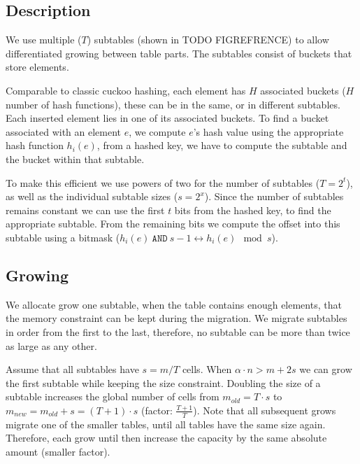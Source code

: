 \documentclass[a4paper,UKenglish]{lipics-v2016}
\begin{document}
\subsection{Description}
We use multiple ($T$) subtables (shown in TODO FIGREFRENCE) to allow
differentiated growing between table parts.  The subtables consist of
buckets that store elements.

Comparable to classic cuckoo hashing, each element has $H$ associated
buckets ($H$ number of hash functions), these can be in the same, or
in different subtables.  Each inserted element lies in one of its
associated buckets.  To find a bucket associated with an element $e$,
we compute $e$'s hash value using the appropriate hash function
$h_i(e)$, from a hashed key, we have to compute the subtable and the bucket
within that subtable.

To make this efficient we use powers of two for the number of
subtables ($T = 2^t$), as well as the individual subtable sizes ($s =
2^x$).  Since the number of subtables remains constant we can use the
first $t$ bits from the hashed key, to find the appropriate subtable.
From the remaining bits we compute the offset into this subtable using
a bitmask ($h_i(e)~\texttt{AND}~s-1 \leftrightarrow h_i(e) \mod s$).



\subsection{Growing}
We allocate grow one subtable,
when the table contains enough elements, that the memory constraint
can be kept during the migration.  We migrate subtables in order
from the first to the last, therefore, no subtable can be more than
twice as large as any other.

Assume that all subtables have $s=m/T$ cells. When $\alpha\cdot n >
m+2s$ we can grow the first subtable while keeping the size
constraint.  Doubling the size of a subtable increases the global
number of cells from $m_{old} = T\cdot s$ to $m_{new} = m_{old}+s =
(T+1)\cdot s$ (factor: $\frac{T+1}{T}$).  Note that all subsequent
grows migrate one of the smaller tables, until all tables have the
same size again.  Therefore, each grow until then increase the
capacity by the same absolute amount (smaller factor).
\end{document}
